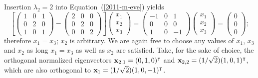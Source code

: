 {Insertion  $\lambda_2=2$ into Equation~(\ref{2011-m-eve}) yields
\begin{equation}
\left[
\begin{pmatrix}
1&0&1\\
0&2&0\\
1&0&1
\end{pmatrix}  -
\begin{pmatrix}
2&0&0\\
0&2&0\\
0&0&2
\end{pmatrix}
\right]
\begin{pmatrix}
x_1\\
x_2\\
x_3
\end{pmatrix}
=
\begin{pmatrix}
-1&0&1\\
0&0&0\\
1&0&-1
\end{pmatrix}
\begin{pmatrix}
x_1\\
x_2\\
x_3
\end{pmatrix}
=
\begin{pmatrix}
0\\
0\\
0
\end{pmatrix}
;
\end{equation}
therefore $x_1=x_3$; $x_2$ is arbitrary.
We are again free to choose any values of $x_1$, $x_3$ and $x_2$ as long
 $x_1=x_3$ as well as $x_2$ are satisfied.
Take, for the sake of choice, the orthogonal
normalized eigenvectors
${\bf x}_{2,1} = (0,1,0)^\intercal $ and
${\bf x}_{2,2} = (1/\sqrt{2})(1,0,1)^\intercal $,
which are also orthogonal to ${\bf x}_1 =(1/\sqrt{2})(1,0,-1)^\intercal $.

}
